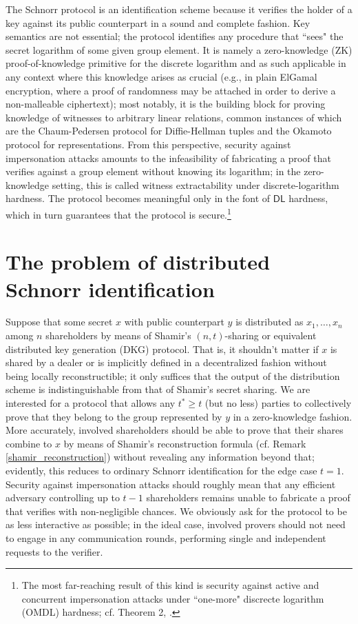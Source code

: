 \documentclass{iacrtrans}
\begin{document}
The Schnorr protocol is an identification scheme
because it verifies the holder of a key
against its public counterpart in a sound and complete fashion.
Key semantics are not essential;
the protocol identifies any procedure
that ``sees" the secret logarithm of some given group element.
It is namely a zero-knowledge (ZK) proof-of-knowledge primitive
for the discrete logarithm and as such applicable in any context where this knowledge arises as crucial
(e.g., in plain ElGamal encryption,
where a proof of randomness
may be attached in order to derive a non-malleable ciphertext);
most notably, it is the building block
for proving knowledge of witnesses to arbitrary linear relations,
common instances of which are
the Chaum-Pedersen protocol for Diffie-Hellman tuples
and the Okamoto protocol for representations.
From this perspective,
security against impersonation attacks
amounts to the infeasibility of fabricating
a proof that verifies against a group element
without knowing its logarithm;
in the zero-knowledge setting,
this is called witness extractability
under discrete-logarithm hardness.
The protocol becomes meaningful
only in the font of $\mathsf{DL}$ hardness,
which in turn guarantees
that the protocol is secure.\footnote{The
most far-reaching result of this kind is
security against active and concurrent impersonation attacks
under ``one-more" discrecte logarithm (OMDL) hardness;
cf. Theorem 2, \cite{paper_bellare_palacio}.}

\section{The problem of distributed Schnorr identification}\label{section_problem}

Suppose that some secret $x$
with public counterpart $y$ is distributed as $x_1, \dots, x_n$
among $n$ shareholders by means of Shamir's $(n, t)$-sharing
or equivalent distributed key generation (DKG)
protocol. That is, it shouldn't matter if $x$ is shared by
a dealer or is implicitly defined in a decentralized
fashion without being locally reconstructible;
it only suffices that the output of the
distribution scheme is indistinguishable
from that of Shamir's secret sharing.
We are interested for a protocol that allows any
$t^* \ge t$ (but no less) parties to collectively prove
that they belong to the group represented by $y$
in a zero-knowledge fashion. More accurately, involved shareholders
should be able to prove that their shares
combine to $x$ by means of Shamir's reconstruction formula
(cf. Remark \ref{shamir_reconstruction})
without revealing any information beyond that;
evidently, this reduces to ordinary Schnorr identification
for the edge case $t=1$.
Security against impersonation attacks should roughly mean that any
efficient adversary controlling up to $t-1$ shareholders
remains unable to fabricate a proof that verifies
with non-negligible chances.
We obviously ask for the protocol to be
as less interactive as possible;
in the ideal case, involved provers should not need to
engage in any communication rounds, performing single and
independent requests to the verifier.
\end{document}
